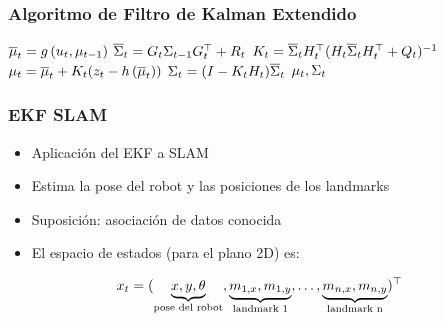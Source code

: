 \begin{frame}
    \frametitle{Algoritmo de Filtro de Kalman Extendido}
    
    \begin{algorithmic}[1]
        \State $\overline{\mu}_{t} = g\left( u_{t}, \mu_{t-1} \right)$
        \State $\overline{\Sigma}_{t} = G_{t} \Sigma_{t-1} G_{t}^{\top}+R_{t}$
        \Statex
        \State $K_{t} = \overline{\Sigma}_{t} H_{t}^{\top} (H_{t} \overline{\Sigma}_{t}  H_{t}^{\top} + Q_{t})^{-1} $
        \State $\mu_{t} = \overline{\mu}_{t} + K_{t} (z_{t} - h\left( \overline{\mu}_{t} \right))$
        \State $\Sigma_{t} =  (I - K_{t} H_{t}) \overline{\Sigma}_{t}$
        \State \Return $\mu_{t}, \Sigma_{t}$
    \EndProcedure
    \end{algorithmic}
\end{frame}

\begin{frame}
    \frametitle{EKF SLAM}

    \begin{itemize}
        \item Aplicación del EKF a SLAM
        \item Estima la pose del robot y las posiciones de los landmarks
        \item Suposición: asociación de datos conocida
        \item El espacio de estados (para el plano 2D) es:
    \end{itemize}
    \[ x_t = (\underbrace{x, y, \theta}_{\text{pose del robot}}, \underbrace{m_{1,x}, m_{1,y}}_{\text{landmark 1}}, \ldots, \underbrace{m_{n,x}, m_{n,y}}_{\text{landmark n}} )^{\top} \]
\end{frame}

